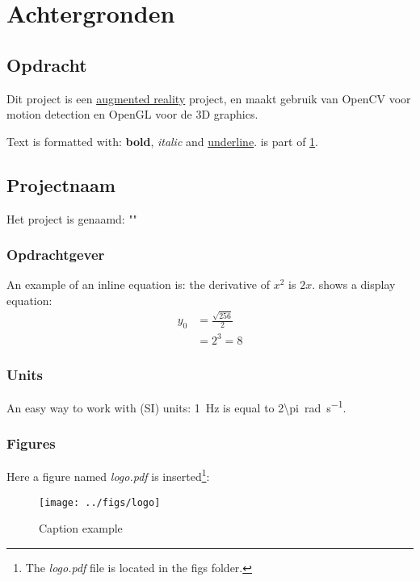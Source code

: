 
\chapter{Achtergronden} \label{cha:your-first-document}

\section{Opdracht} \label{sec:opdracht}

Dit project is een \underline{augmented reality} project, en maakt gebruik van OpenCV voor motion detection en OpenGL voor de 3D graphics.

Text is formatted with: \textbf{bold}, \textit{italic} and \underline{underline}.
 is part of \cref{cha:your-first-document}.

\section{Projectnaam} \label{sec:projectnaam}
Het project is genaamd: "\projectname"


\subsection{Opdrachtgever} \label{subsec:opdrachtgever}

An example of an inline equation is: the derivative of $x^2$ is $2x$.  shows a display equation:
\begin{align} \label{eq:example}
          y_{0} &= \frac{\sqrt{256}}{2} \\
                &= 2^{3} = 8 \nonumber 
\end{align}


\subsection{Units} \label{subsec:units}

An easy way to work with (SI) units: \SI{1}{\hertz} is equal to \SI{2\pi}{\radian\per\second}.


\subsection{Figures} \label{subsec:figures}

Here a figure named \textit{logo.pdf} is inserted\footnote{The \textit{logo.pdf} file is located in the figs folder.}:
\begin{figure}[h]
  \centering
  \texttt{[image: ../figs/logo]}
  \caption{Caption example}
  \label{fig:logo}
\end{figure}


